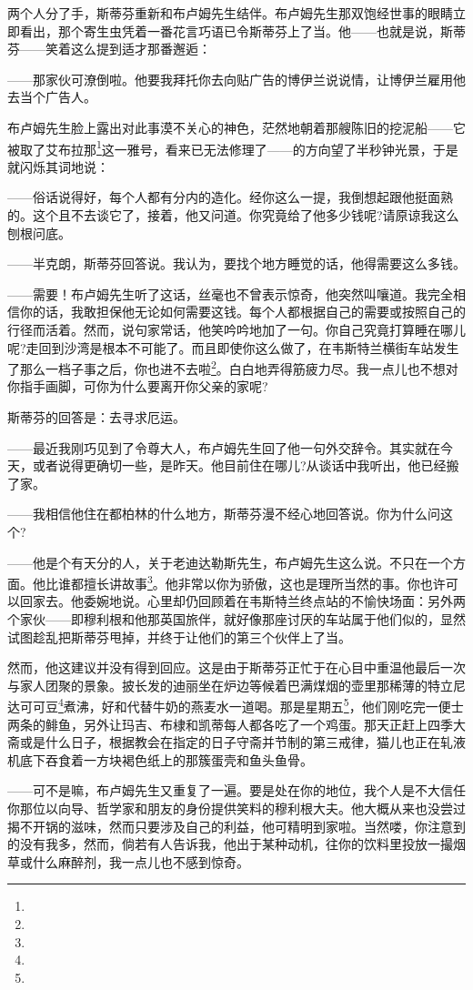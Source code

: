 \par 两个人分了手，斯蒂芬重新和布卢姆先生结伴。布卢姆先生那双饱经世事的眼睛立即看出，那个寄生虫凭着一番花言巧语已令斯蒂芬上了当。他——也就是说，斯蒂芬——笑着这么提到适才那番邂逅：
\par ——那家伙可潦倒啦。他要我拜托你去向贴广告的博伊兰说说情，让博伊兰雇用他去当个广告人。
\par 布卢姆先生脸上露出对此事漠不关心的神色，茫然地朝着那艘陈旧的挖泥船——它被取了艾布拉那\footnote{}这一雅号，看来已无法修理了——的方向望了半秒钟光景，于是就闪烁其词地说：
\par ——俗话说得好，每个人都有分内的造化。经你这么一提，我倒想起跟他挺面熟的。这个且不去谈它了，接着，他又问道。你究竟给了他多少钱呢?请原谅我这么刨根问底。
\par ——半克朗，斯蒂芬回答说。我认为，要找个地方睡觉的话，他得需要这么多钱。
\par ——需要！布卢姆先生听了这话，丝毫也不曾表示惊奇，他突然叫嚷道。我完全相信你的话，我敢担保他无论如何需要这钱。每个人都根据自己的需要或按照自己的行径而活着。然而，说句家常话，他笑吟吟地加了一句。你自己究竟打算睡在哪儿呢?走回到沙湾是根本不可能了。而且即使你这么做了，在韦斯特兰横街车站发生了那么一档子事之后，你也进不去啦\footnote{}。白白地弄得筋疲力尽。我一点儿也不想对你指手画脚，可你为什么要离开你父亲的家呢?
\par 斯蒂芬的回答是：去寻求厄运。
\par ——最近我刚巧见到了令尊大人，布卢姆先生回了他一句外交辞令。其实就在今天，或者说得更确切一些，是昨天。他目前住在哪儿?从谈话中我听出，他已经搬了家。
\par ——我相信他住在都柏林的什么地方，斯蒂芬漫不经心地回答说。你为什么问这个?
\par ——他是个有天分的人，关于老迪达勒斯先生，布卢姆先生这么说。不只在一个方面。他比谁都擅长讲故事\footnote{}。他非常以你为骄傲，这也是理所当然的事。你也许可以回家去。他委婉地说。心里却仍回顾着在韦斯特兰终点站的不愉快场面：另外两个家伙——即穆利根和他那英国旅伴，就好像那座讨厌的车站属于他们似的，显然试图趁乱把斯蒂芬甩掉，并终于让他们的第三个伙伴上了当。
\par 然而，他这建议并没有得到回应。这是由于斯蒂芬正忙于在心目中重温他最后一次与家人团聚的景象。披长发的迪丽坐在炉边等候着巴满煤烟的壶里那稀薄的特立尼达可可豆\footnote{}煮沸，好和代替牛奶的燕麦水一道喝。那是星期五\footnote{}，他们刚吃完一便士两条的鲱鱼，另外让玛吉、布棣和凯蒂每人都各吃了一个鸡蛋。那天正赶上四季大斋或是什么日子，根据教会在指定的日子守斋并节制的第三戒律，猫儿也正在轧液机底下吞食着一方块褐色纸上的那簇蛋壳和鱼头鱼骨。
\par ——可不是嘛，布卢姆先生又重复了一遍。要是处在你的地位，我个人是不大信任你那位以向导、哲学家和朋友的身份提供笑料的穆利根大夫。他大概从来也没尝过揭不开锅的滋味，然而只要涉及自己的利益，他可精明到家啦。当然喽，你注意到的没有我多，然而，倘若有人告诉我，他出于某种动机，往你的饮料里投放一撮烟草或什么麻醉剂，我一点儿也不感到惊奇。
